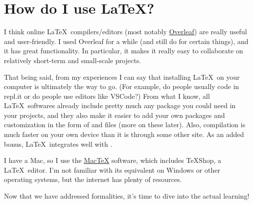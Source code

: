 \section{How do I use \LaTeX?}
I think online \LaTeX\ compilers/editors (most notably \href{http://www.overleaf.com}{Overleaf}) are really useful and user-friendly. I used Overleaf for a while (and still do for certain things), and it has great functionality. In particular, it makes it really easy to collaborate on relatively short-term and small-scale projects. 

That being said, from my experiences I can say that installing \LaTeX\ on your computer is ultimately the way to go. (For example, do people usually code in repl.it or do people use editors like VSCode?) From what I know, all \LaTeX\ softwares already include pretty much any package you could need in your projects, and they also make it easier to add your own packages and customization in the form of  and  files (more on these later). Also, compilation is much faster on your own device than it is through some other site. As an added bonus, \LaTeX\ integrates well with .

I have a Mac, so I use the \href{https://www.tug.org/mactex/}{Mac\TeX} software, which includes \TeX Shop, a \LaTeX\ editor. I'm not familiar with its equivalent on Windows or other operating systems, but the internet has plenty of resources.

\hrulefill

Now that we have addressed formalities, it's time to dive into the actual learning!

